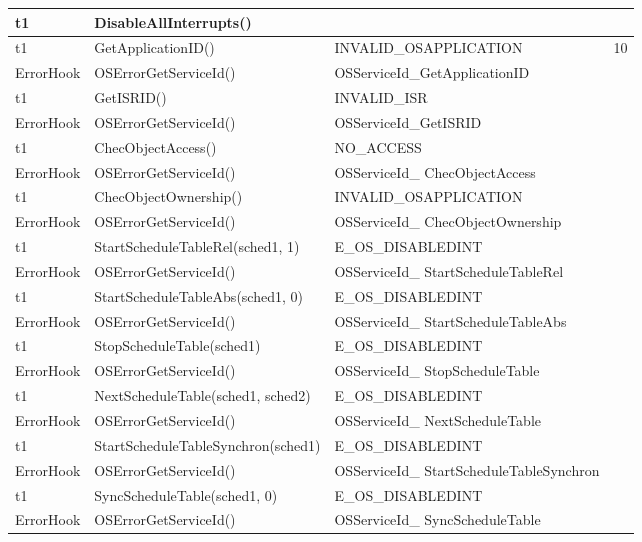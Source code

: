 \documentclass[10pt]{article}
\newlength{\Li}\settowidth{\Li}{Running}
\newlength{\Lii}\setlength{\Lii}{7cm}
\newlength{\Liiii}\setlength{\Liiii}{0.9cm}
\newlength{\Liii}\setlength{\Liii}{\textwidth} \addtolength{\Liii}{-\Li} \addtolength{\Liii}{-\Lii} \addtolength{\Liii}{-\Liiii}
\begin{document}
	\begin{supertabular}{|p{\Li}|p{\Lii}|p{\Liii}|p{\Liiii}|} \hline 
	t1		& DisableAllInterrupts()								& 									& \\ \hline
	t1		& GetApplicationID()									& INVALID\_OSAPPLICATION				& 10 \\ \hline
	ErrorHook	& OSErrorGetServiceId()								& OSServiceId\_GetApplicationID			& \\ \hline
	t1		& GetISRID()										& INVALID\_ISR						& \\ \hline
	ErrorHook	& OSErrorGetServiceId()								& OSServiceId\_GetISRID					& \\ \hline
	t1		& ChecObjectAccess()								& NO\_ACCESS						& \\ \hline
	ErrorHook	& OSErrorGetServiceId()								& OSServiceId\_ ChecObjectAccess			& \\ \hline
	t1		& ChecObjectOwnership()							& INVALID\_OSAPPLICATION				& \\ \hline
	ErrorHook	& OSErrorGetServiceId()								& OSServiceId\_ ChecObjectOwnership		& \\ \hline
	t1		& StartScheduleTableRel(sched1, 1)					& E\_OS\_DISABLEDINT					& \\ \hline
	ErrorHook	& OSErrorGetServiceId()								& OSServiceId\_ StartScheduleTableRel		& \\ \hline
	t1		& StartScheduleTableAbs(sched1, 0)					& E\_OS\_DISABLEDINT					& \\ \hline
	ErrorHook	& OSErrorGetServiceId()								& OSServiceId\_ StartScheduleTableAbs		& \\ \hline
	t1		& StopScheduleTable(sched1)							& E\_OS\_DISABLEDINT					& \\ \hline
	ErrorHook	& OSErrorGetServiceId()								& OSServiceId\_ StopScheduleTable		& \\ \hline
	t1		& NextScheduleTable(sched1, sched2)					& E\_OS\_DISABLEDINT					& \\ \hline
	ErrorHook	& OSErrorGetServiceId()								& OSServiceId\_ NextScheduleTable		& \\ \hline
	t1		& StartScheduleTableSynchron(sched1)					& E\_OS\_DISABLEDINT					& \\ \hline
	ErrorHook	& OSErrorGetServiceId()								& OSServiceId\_ StartScheduleTableSynchron	& \\ \hline
	t1		& SyncScheduleTable(sched1, 0)						& E\_OS\_DISABLEDINT					& \\ \hline
	ErrorHook	& OSErrorGetServiceId()								& OSServiceId\_ SyncScheduleTable		& \\ \hline

\end{supertabular}
\end{document}
